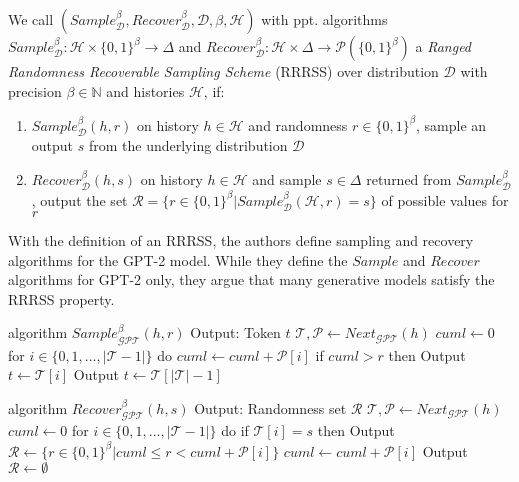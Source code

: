 \begin{definition}
  \label{def:rrrss}
  We call 
  $(Sample_{\mathcal{D}}^\beta, Recover_{\mathcal{D}}^\beta, \mathcal{D}, \beta, \mathcal{H})$ 
  with ppt. algorithms
  $Sample_{\mathcal{D}}^\beta \colon \mathcal{H} \times \{0,1\}^\beta \rightarrow \Delta$ 
  and 
  $Recover_{\mathcal{D}}^\beta \colon \mathcal{H} \times \Delta \rightarrow \mathcal{P}(\{0,1\}^\beta)$ 
  a \emph{Ranged Randomness Recoverable Sampling Scheme} (RRRSS) over distribution $\mathcal{D}$ with precision $\beta \in \mathbb{N}$ and histories $\mathcal{H}$, if:
  
  \begin{enumerate}
    \item $Sample_{\mathcal{D}}^\beta(h, r)$ on history $h \in \mathcal{H}$ and randomness $r \in \{0,1\}^\beta$, sample an output $s$ from the underlying distribution $\mathcal{D}$
    \item $Recover_{\mathcal{D}}^\beta(h, s)$ on history $h \in \mathcal{H}$ and sample $s \in \Delta$ returned from $Sample_{\mathcal{D}}^\beta$, output the set $\mathcal{R} = \{ r \in \{0,1\}^\beta | Sample_{\mathcal{D}}^\beta(\mathcal{H}, r) = s \}$ of possible values for $r$
  \end{enumerate}
\end{definition}

With the definition of an RRRSS, the authors define sampling and recovery algorithms for the GPT-2 model.
While they define the $Sample$ and $Recover$ algorithms for GPT-2 only, they argue that many generative models satisfy the RRRSS property.

\begin{Pseudocode}[caption={
RRRSS $Sample$ algorithm for GPT-2 \cite{Meteor2021}.
$Sample$ produces, given a history $h$ and a value $r$, the next token sampled according to $r$ from the distribution for the next token generated by $Next_{\mathcal{GPT}}(h)$.
}]
algorithm $Sample_{\mathcal{GPT}}^\beta(  h, r)$
  Output: Token $t$
  $\mathcal{T}, \mathcal{P} \leftarrow Next_{\mathcal{GPT}}(h)$
  $cuml \leftarrow 0$
  for $i \in \{ 0, 1, \dots, | \mathcal{T} - 1 | \}$ do
    $cuml \leftarrow cuml + \mathcal{P}[i]$
    if $cuml > r$ then
      Output $t \leftarrow \mathcal{T}[i]$
  Output $t \leftarrow \mathcal{T}[|\mathcal{T}|-1]$
\end{Pseudocode}

\begin{Pseudocode}[caption={
RRRSS $Recover$ algorithm for GPT-2 \cite{Meteor2021}.
Given a history $h$ and a sample $s$, return a set of possible random values used to generate $s$ with history $h$.
}]
algorithm $Recover_{\mathcal{GPT}}^\beta(h, s)$
  Output: Randomness set $\mathcal{R}$
  $\mathcal{T}, \mathcal{P} \leftarrow Next_{\mathcal{GPT}}(h)$
  $cuml \leftarrow 0$
  for $i \in \{ 0, 1, \dots, | \mathcal{T} - 1 | \}$ do
    if $\mathcal{T}[i] = s$ then
      Output $\mathcal{R} \leftarrow \{ r \in \{ 0, 1\}^\beta | cuml \leq r < cuml + \mathcal{P}[i] \}$
    $cuml \leftarrow cuml + \mathcal{P}[i]$
  Output $\mathcal{R} \leftarrow \emptyset$
\end{Pseudocode}

